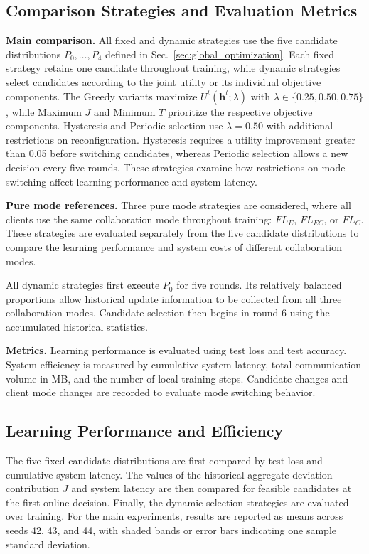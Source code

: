 \documentclass[5p,times]{elsarticle}
\theoremstyle{plain}
\theoremstyle{definition}
\theoremstyle{remark}
\begin{document}
	\subsection{Comparison Strategies and Evaluation Metrics}
	\label{sec:exp_strategies_metrics}
	
	\textbf{Main comparison.}
	All fixed and dynamic strategies use the five candidate
	distributions $P_0,\ldots,P_4$ defined in
	Sec.~\ref{sec:global_optimization}.
	Each fixed strategy retains one candidate throughout
	training, while dynamic strategies select candidates
	according to the joint utility or its individual
	objective components.
	The Greedy variants maximize
	$U^t(\mathbf h^t;\lambda)$ with
	$\lambda\in\{0.25,0.50,0.75\}$,
	while Maximum $J$ and Minimum $T$ prioritize
	the respective objective components.
	Hysteresis and Periodic selection use
	$\lambda=0.50$ with additional restrictions
	on reconfiguration.
	Hysteresis requires a utility improvement
	greater than 0.05 before switching candidates,
	whereas Periodic selection allows a new
	decision every five rounds.
	These strategies examine how restrictions
	on mode switching affect learning performance
	and system latency.
	
	\textbf{Pure mode references.}
	Three pure mode strategies are considered, where
	all clients use the same collaboration mode
	throughout training: $FL_E$, $FL_{EC}$, or $FL_C$.
	These strategies are evaluated separately from
	the five candidate distributions to compare
	the learning performance and system costs of
	different collaboration modes.
	
	All dynamic strategies first execute $P_0$ for five rounds.
	Its relatively balanced proportions allow historical update
	information to be collected from all three collaboration modes.
	Candidate selection then begins in round 6 using the
	accumulated historical statistics.
	
	\textbf{Metrics.}
	Learning performance is evaluated using test loss
	and test accuracy. System efficiency is measured
	by cumulative system latency, total communication
	volume in MB, and the number of local training steps.
	Candidate changes and client mode changes are recorded
	to evaluate mode switching behavior.
	\subsection{Learning Performance and Efficiency}
	\label{sec:exp_convergence}
	\label{sec:main_comparison}
	The five fixed candidate distributions are first compared by test loss and cumulative system latency. The values of the historical aggregate deviation contribution \(J\) and system latency are then compared for feasible candidates at the first online decision. Finally, the dynamic selection strategies are evaluated over training. For the main experiments, results are reported
	as means across seeds 42, 43, and 44, with
	shaded bands or error bars indicating one
	sample standard deviation.
\end{document}
